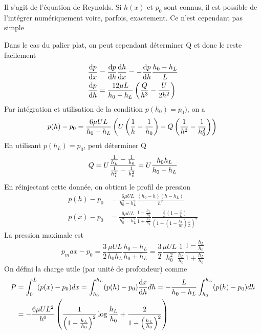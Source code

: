     Il s'agit de l'équation de Reynolds. Si $h(x)$ et $p_0$ sont connus, il est possible de l'intégrer numériquement voire, parfois, exactement. Ce n'est cependant pas simple

    Dans le cas du palier plat, on peut cependant déterminer Q et donc le reste facilement
    \begin{equation}
      \begin{aligned}
        \dv{p}{x} &= \dv{p}{h}\dv{h}{x} = -\dv{p}{h}\frac{h_0 - h_L}{L}\\
        \dv{p}{h} &= \frac{12 \mu L}{h_0 - h_L} \left(\frac{Q}{h^3} - \frac{U}{2h^2}\right)
      \end{aligned}
    \end{equation}
    Par intégration et utilisation de la condition $p(h_0) = p_0)$, on a
    \begin{equation}
      p(h) - p_0 = \frac{6\mu U L}{h_0 - h_L} \left(U \left(\frac{1}{h} - \frac{1}{h_0}\right) - Q \left(\frac{1}{h^2} - \frac{1}{h_0^2}\right)\right)\\
    \end{equation}
    En utilisant $p(h_L) = p_0$, peut déterminer Q
    \begin{equation}
      Q = U\frac{\frac{1}{h_L} - \frac{1}{h_0}}{\frac{1}{h^2_L}- \frac{1}{h^2_0}} = U\frac{h_0 h_L}{h_0 + h_L}
    \end{equation}
    En réinjectant cette donnée, on obtient le profil de pression
    \begin{equation}
      \begin{aligned}
        p(h) - p_0 &= \frac{6\mu U L}{h_0^2 - h_L^2}\frac{(h_0 - h)(h-h_L)}{h^2}\\
        p(x) - p_0 &= \frac{6\mu U L}{h_0^2 - h_L^2}\frac{1-\frac{h_L}{h_0}}{1+\frac{h_L}{h_0}}\frac{\frac{x}{L}\left(1 - \frac{x}{L}\right)}{\left(1 - \left(1 - \frac{h_L}{h_0}\right)\frac{x}{L}\right)^2}
      \end{aligned}
    \end{equation}
    La pression maximale est
    \begin{equation}
      p_max - p_0 = \frac{3}{2} \frac{\mu U L}{h_0 h_L} \frac{h_0 - h_L}{h_0 + h_L} = \frac{3}{2} \frac{\mu U L}{h^2_0} \frac{1}{\frac{h_L}{h_0}} \frac{1 - \frac{h_L}{h_0}}{1+ \frac{h_L}{h_0}}
    \end{equation}
    On défini la charge utile (par unité de profondeur) comme
    \begin{equation}
      \begin{aligned}
        P &= \int_0^L(p(x)-p_0)dx = \int_{h_0}^{h_L} (p(h) - p_0)\dv{x}{h} dh = -\frac{L}{h_0-h_L} \int^{h_L}_{h_0} (p(h)-p_0)dh\\
        &= -\frac{6\mu U L^2}{h^0} \left(\frac{1}{\left(1-\frac{h_L}{h_0}\right)^2} \log\frac{h_L}{h_0} + \frac{2}{1- \left(\frac{h_L}{h_0}\right)^2}\right)
      \end{aligned}
    \end{equation}
